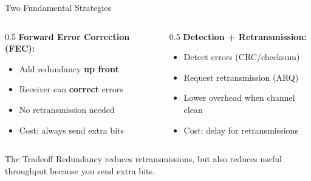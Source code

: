 \documentclass[aspectratio=169,11pt]{beamer}
\begin{document}
\begin{frame}{Two Fundamental Strategies}
    \begin{columns}[T]
        \begin{column}{0.5\textwidth}
            \textbf{Forward Error Correction (FEC):}
            \begin{itemize}
                \item Add redundancy \textbf{up front}
                \item Receiver can \textbf{correct} errors
                \item No retransmission needed
                \item Cost: always send extra bits
            \end{itemize}
        \end{column}
        \begin{column}{0.5\textwidth}
            \textbf{Detection + Retransmission:}
            \begin{itemize}
                \item Detect errors (CRC/checksum)
                \item Request retransmission (ARQ)
                \item Lower overhead when channel clean
                \item Cost: delay for retransmissions
            \end{itemize}
        \end{column}
    \end{columns}
    
    \vspace{0.3cm}
    \begin{alertblock}{The Tradeoff}
        Redundancy reduces retransmissions, but also reduces useful throughput because you send extra bits.
    \end{alertblock}
\end{frame}
\end{document}
